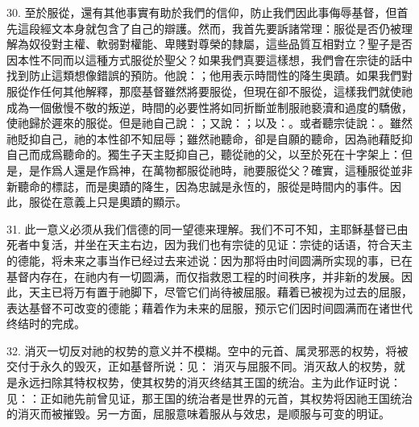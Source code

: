 30. 至於服從，還有其他事實有助於我們的信仰，防止我們因此事侮辱基督，但首先這段經文本身就包含了自己的辯護。然而，我首先要訴諸常理：服從是否仍被理解為奴役對主權、軟弱對權能、卑賤對尊榮的隸屬，這些品質互相對立？聖子是否因本性不同而以這種方式服從於聖父？如果我們真要這樣想，我們會在宗徒的話中找到防止這類想像錯誤的預防。他說：；他用表示時間性的降生奧蹟。如果我們對服從作任何其他解釋，那麼基督雖然將要服從，但現在卻不服從，這樣我們就使祂成為一個傲慢不敬的叛逆，時間的必要性將如同折斷並制服祂褻瀆和過度的驕傲，使祂歸於遲來的服從。但是祂自己說：；又說：；以及：。或者聽宗徒說：。雖然祂貶抑自己，祂的本性卻不知屈辱；雖然祂聽命，卻是自願的聽命，因為祂藉貶抑自己而成爲聽命的。獨生子天主貶抑自己，聽從祂的父，以至於死在十字架上：但是，是作爲人還是作爲神，在萬物都服從祂時，祂要服從父？確實，這種服從並非新聽命的標誌，而是奧蹟的降生，因為忠誠是永恆的，服從是時間内的事件。因此，服從在意義上只是奧蹟的顯示。\par

31. 此一意义必须从我们信德的同一望德来理解。我们不可不知，主耶稣基督已由死者中复活，并坐在天主右边，因为我们也有宗徒的见证：宗徒的话语，符合天主的德能，将未来之事当作已经过去来述说：因为那将由时间圆满所实现的事，已在基督内存在，在祂内有一切圆满，而仅指救恩工程的时间秩序，并非新的发展。因此，天主已将万有置于祂脚下，尽管它们尚待被屈服。藉着已被视为过去的屈服，表达基督不可改变的德能；藉着作为未来的屈服，预示它们因时间圆满而在诸世代终结时的完成。\par

32. 消灭一切反对祂的权势的意义并不模糊。空中的元首、属灵邪恶的权势，将被交付于永久的毁灭，正如基督所说：见： 消灭与屈服不同。消灭敌人的权势，就是永远扫除其特权权势，使其权势的消灭终结其王国的统治。主为此作证时说：见：：正如祂先前曾见证，那王国的统治者是世界的元首，其权势将因祂王国统治的消灭而被摧毁。另一方面，屈服意味着服从与效忠，是顺服与可变的明证。\par

